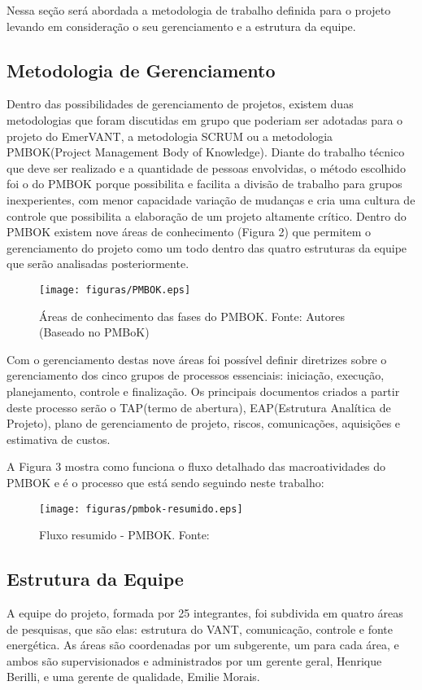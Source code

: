 Nessa seção será abordada a metodologia de trabalho definida para o projeto levando em consideração o seu gerenciamento e a estrutura da equipe.
\subsection{Metodologia de Gerenciamento}

Dentro das possibilidades de gerenciamento de projetos, existem duas metodologias que foram discutidas em grupo que poderiam ser adotadas para o projeto do EmerVANT, a metodologia SCRUM ou a metodologia PMBOK(Project Management Body of Knowledge). Diante do trabalho técnico que deve ser realizado e a quantidade de pessoas envolvidas, o método escolhido foi o do PMBOK porque possibilita e facilita a divisão de trabalho para grupos inexperientes, com menor capacidade variação de mudanças e cria uma cultura de controle que possibilita a elaboração de um projeto altamente crítico. Dentro do PMBOK existem nove áreas de conhecimento (Figura 2) que permitem o gerenciamento do projeto como um todo dentro das quatro estruturas da equipe que serão analisadas posteriormente.

 \begin{figure}[ht]
	\centering
		\texttt{[image: figuras/PMBOK.eps]}
	\caption[Áreas de conhecimento das fases do PMBOK]{Áreas de conhecimento das fases do PMBOK. Fonte: Autores (Baseado no PMBoK)}
\end{figure}

Com o gerenciamento destas nove áreas foi possível definir diretrizes sobre o gerenciamento dos cinco grupos de processos essenciais: iniciação, execução, planejamento, controle e finalização. Os principais documentos criados a partir deste processo serão o TAP(termo de abertura), EAP(Estrutura Analítica de Projeto), plano de gerenciamento de projeto, riscos, comunicações, aquisições e estimativa de custos.

A Figura 3 mostra como funciona o fluxo detalhado das macroatividades do PMBOK e é o processo que está sendo seguindo neste trabalho:

\begin{figure}[ht]
	\centering
		\texttt{[image: figuras/pmbok-resumido.eps]}
	\caption[Fluxo resumido - PMBOK]{Fluxo resumido - PMBOK. Fonte: \cite{pmbok}}
\end{figure}

\subsection{Estrutura da Equipe}
A equipe do projeto, formada por 25 integrantes, foi subdivida em quatro áreas de pesquisas, que são elas: estrutura do VANT, comunicação, controle e fonte energética. As áreas são coordenadas por um subgerente, um para cada área, e ambos são supervisionados e administrados por um gerente geral, Henrique Berilli, e uma gerente de qualidade, Emilie Morais.

